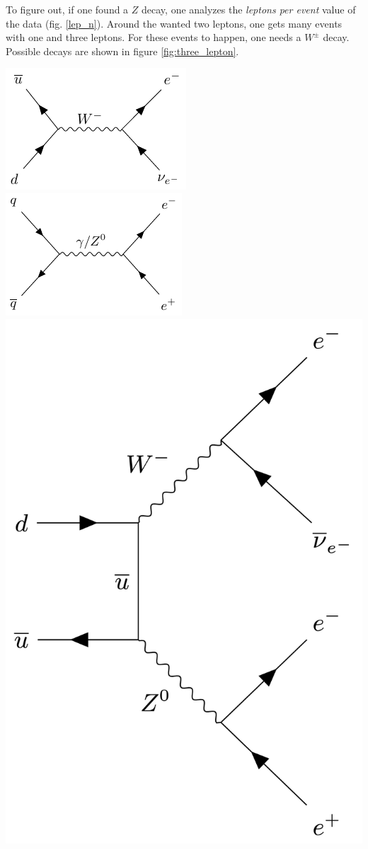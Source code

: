 \documentclass[12pt, a4paper, bibliography=totoc]{scrartcl}
\begin{document}
\begin{multicols}{2}
To figure out, if one found a $Z$ decay, one analyzes the \textit{leptons per event} value of the data (fig. \ref{lep_n}).
Around the wanted two leptons, one gets many events with one and three leptons. 
For these events to happen, one needs a $W^{\pm}$ decay.
Possible decays are shown in figure \ref{fig:three_lepton}.
    \begin{center}
        \includegraphics[width=0.45\linewidth]{fig/feynman_1.pdf} \hfill
        \includegraphics[width=0.45\linewidth]{fig/feynman_2.pdf} \\
        \includegraphics[width=0.45\linewidth]{fig/feynman_3.png}
\label{fig:three_lepton}
\end{center}


\end{multicols}
\end{document}
